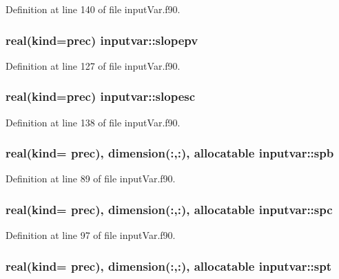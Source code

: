 Definition at line 140 of file input\-Var.\-f90.

\hypertarget{classinputvar_a14912f73e74d3dedf580804ab63fd57f}{
\subsubsection[{slopepv}]{\setlength{\rightskip}{0pt plus 5cm}real(kind=prec) inputvar\-::slopepv}}\label{classinputvar_a14912f73e74d3dedf580804ab63fd57f}


Definition at line 127 of file input\-Var.\-f90.

\hypertarget{classinputvar_a38a21450f63b87e2e09c5c4eedd3e6ef}{
\subsubsection[{slopesc}]{\setlength{\rightskip}{0pt plus 5cm}real(kind=prec) inputvar\-::slopesc}}\label{classinputvar_a38a21450f63b87e2e09c5c4eedd3e6ef}


Definition at line 138 of file input\-Var.\-f90.

\hypertarget{classinputvar_acd5ae0efcfc5e54e9c73d085132bcf5a}{
\subsubsection[{spb}]{\setlength{\rightskip}{0pt plus 5cm}real(kind= prec), dimension(\-:,\-:), allocatable inputvar\-::spb}}\label{classinputvar_acd5ae0efcfc5e54e9c73d085132bcf5a}


Definition at line 89 of file input\-Var.\-f90.

\hypertarget{classinputvar_a7a6b03a57941065017f0fe71a9d641f1}{
\subsubsection[{spc}]{\setlength{\rightskip}{0pt plus 5cm}real(kind= prec), dimension(\-:,\-:), allocatable inputvar\-::spc}}\label{classinputvar_a7a6b03a57941065017f0fe71a9d641f1}


Definition at line 97 of file input\-Var.\-f90.

\hypertarget{classinputvar_aa1da1474767137ee483ef4253b7cef85}{
\subsubsection[{spt}]{\setlength{\rightskip}{0pt plus 5cm}real(kind= prec), dimension(\-:,\-:), allocatable inputvar\-::spt}}\label{classinputvar_aa1da1474767137ee483ef4253b7cef85}


